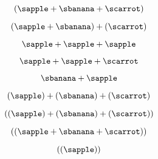 {\begin{forslides}
\begin{equation}\label{eq:fruit-sum-8}
 ( \sapple   +  \sbanana  +  \scarrot) 
\end{equation}

\begin{equation}\label{eq:fruit-sum-9}
 ( \sapple   +  \sbanana ) +  (\scarrot)
\end{equation}


\begin{equation}\label{eq:fruit-sum-10}
  \sapple   +   \sapple   + \sapple  
\end{equation}

\begin{equation}\label{eq:fruit-sum-11}
  \sapple   +   \sapple   + \scarrot
\end{equation}

\begin{equation}\label{eq:fruit-sum-12}
\sbanana +  \sapple   
\end{equation}

\begin{equation}\label{eq:fruit-sum-13}
 ( \sapple )   +  ( \sbanana )  +  ( \scarrot) 
\end{equation}

\begin{equation}\label{eq:fruit-sum-14}
( ( \sapple )   +  ( \sbanana )  +  ( \scarrot) )
\end{equation}

\begin{equation}\label{eq:fruit-sum-15}
 ( ( \sapple   +  \sbanana  +  \scarrot ) )
\end{equation}

\begin{equation}\label{eq:fruit-sum-16}
 (( \sapple ))
\end{equation}

\end{forslides}

}



\begin{exercise}
\end{exercise}
\begin{solution}
\end{solution}

